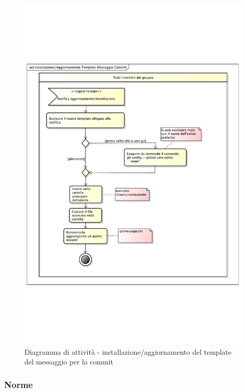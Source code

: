 			\begin{figure}[htbp]
				\centering
				\includegraphics[width=14cm]{images/inst_tpl_commit_msg.pdf}
				\caption{Diagramma di attività - installazione/aggiornamento del template del messaggio per la commit}
				\label{fig:installazione_msg_commit}
			\end{figure}
			
		\subsubsection{Norme}
